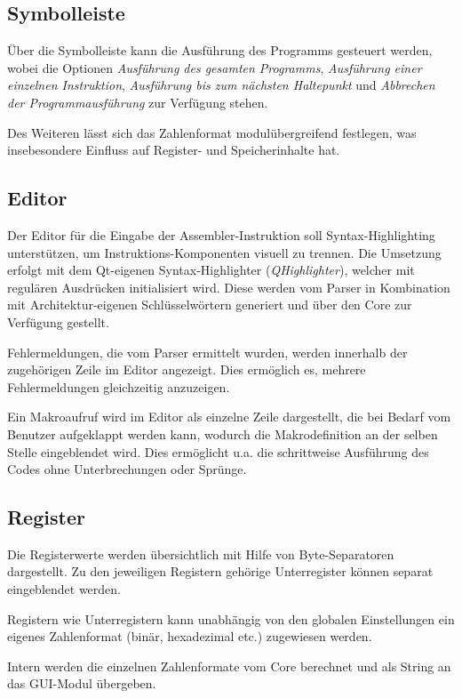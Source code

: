 \subsection{Symbolleiste}

Über die Symbolleiste kann die Ausführung des Programms gesteuert werden, wobei die Optionen \textit{Ausführung des gesamten Programms}, \textit{Ausführung einer einzelnen Instruktion}, \textit{Ausführung bis zum
  nächsten Haltepunkt} und \textit{Abbrechen der Programmausführung} zur Verfügung stehen.

Des Weiteren lässt sich das Zahlenformat modulübergreifend festlegen, was insebesondere Einfluss auf Register- und Speicherinhalte hat.

\subsection{Editor}

Der Editor für die Eingabe der Assembler-Instruktion soll Syntax-Highlighting unterstützen, um Instruktions-Komponenten visuell zu trennen. Die Umsetzung erfolgt mit dem Qt-eigenen Syntax-Highlighter (\textit{QHighlighter}), welcher mit regulären Ausdrücken initialisiert wird. Diese werden vom Parser in Kombination mit Architektur-eigenen Schlüsselwörtern generiert und über den Core zur Verfügung gestellt.

Fehlermeldungen, die vom Parser ermittelt wurden, werden innerhalb der zugehörigen Zeile im Editor angezeigt. Dies ermöglich es, mehrere Fehlermeldungen gleichzeitig anzuzeigen.

Ein Makroaufruf wird im Editor als einzelne Zeile dargestellt, die bei Bedarf vom Benutzer aufgeklappt werden kann, wodurch die Makrodefinition an der selben Stelle eingeblendet wird. Dies ermöglicht u.a. die schrittweise Ausführung des Codes ohne Unterbrechungen oder Sprünge.

\subsection{Register}

Die Registerwerte werden übersichtlich mit Hilfe von Byte-Separatoren dargestellt. Zu den jeweiligen Registern gehörige Unterregister können separat eingeblendet werden.

Registern wie Unterregistern kann unabhängig von den globalen Einstellungen ein eigenes Zahlenformat (binär, hexadezimal etc.) zugewiesen werden.

Intern werden die einzelnen Zahlenformate vom Core berechnet und als String an das GUI-Modul übergeben.

